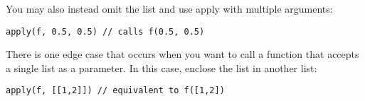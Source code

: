 You may also instead omit the list and use apply with multiple
arguments:

\begin{lstlisting}
apply(f, 0.5, 0.5) // calls f(0.5, 0.5)
\end{lstlisting}

There is one edge case that occurs when you want to call a function that
accepts a single list as a parameter. In this case, enclose the list in
another list:

\begin{lstlisting}
apply(f, [[1,2]]) // equivalent to f([1,2])
\end{lstlisting}
